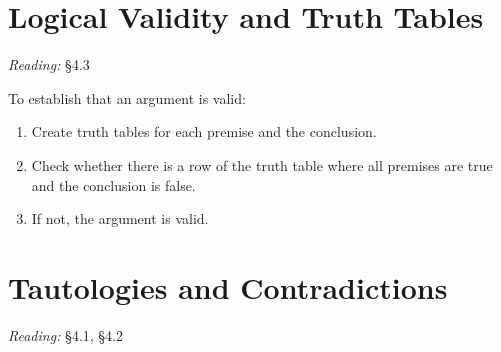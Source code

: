 \documentclass[12pt]{extarticle}
\begin{document}
\begin{multicols*}{3}
 
 
\section{Logical Validity and Truth Tables}
 
\emph{Reading:} §4.3
 

 
\begin{minipage}{\columnwidth}
 
To establish that an argument is valid:
 
\begin{enumerate}
 
\item Create truth tables for each premise and the conclusion.
 
\item Check whether there is a row of the truth table where all premises are true and the conclusion is false.
 
\item If not, the argument is valid.
 
\end{enumerate}
 
\end{minipage}
 
 
 
\section{Tautologies and Contradictions}
 
\emph{Reading:} §4.1, §4.2
 

\end{multicols*}
\end{document}
